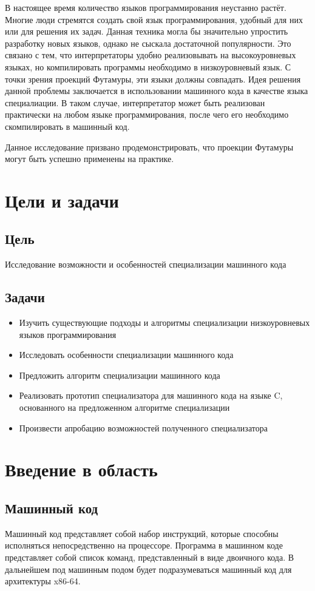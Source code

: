 \documentclass{spbau-diploma}
\begin{document}
В настоящее время количество языков программирования неустанно растёт. Многие люди стремятся создать свой язык программирования, удобный для них или для решения их задач. Данная техника могла бы значительно упростить разработку новых языков, однако не сыскала достаточной популярности. Это связано с тем, что интерпретаторы удобно реализовывать на высокоуровневых языках, но компилировать программы необходимо в низкоуровневый язык. С точки зрения проекций Футамуры, эти языки должны совпадать. Идея решения данной проблемы заключается в использовании машинного кода в качестве языка специалиации. В таком случае, интерпретатор может быть реализован практически на любом языке  программирования, после чего его необходимо скомпилировать в машинный код.

Данное исследование призвано продемонстрировать, что проекции Футамуры могут быть успешно применены на практике.

\section{Цели и задачи}

\subsection{Цель}
Исследование возможности и особенностей специализации машинного кода

\subsection{Задачи}
\begin{itemize}
\item Изучить существующие подходы и алгоритмы специализации низкоуровневых языков программирования
\item Исследовать особенности специализации машинного кода
\item Предложить алгоритм специализации машинного кода
\item Реализовать прототип специализатора для машинного кода на языке C, основанного на предложенном алгоритме специализации
\item Произвести апробацию возможностей полученного специализатора
\end{itemize}

\section{ Введение в область}
\subsection{ Машинный код}
Машинный код\cite{AMD} представляет собой набор инструкций, которые способны исполняться непосредственно на процессоре. Программа в машинном коде представляет собой список команд, представленный в виде двоичного кода. В дальнейшем под машинным подом будет подразумеваться машинный код для архитектуры x86-64.
\end{document}
